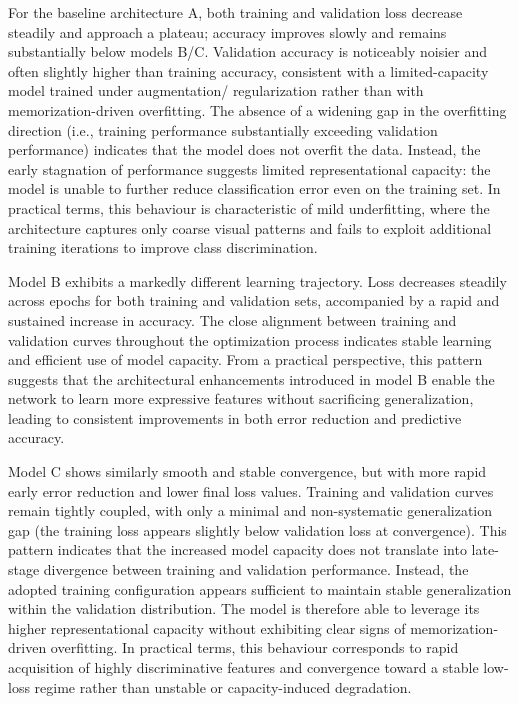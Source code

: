\documentclass{article}
\begin{document}
For the baseline architecture A, both training and validation loss 
decrease steadily and approach a plateau; accuracy improves slowly 
and remains substantially below models B/C. Validation accuracy is 
noticeably noisier and often slightly higher than training accuracy, 
consistent with a limited-capacity model trained under augmentation/
regularization rather than with memorization-driven overfitting. 
The absence of a widening gap in the overfitting direction (i.e., 
training performance substantially exceeding validation performance) 
indicates that the model does not overfit the data. Instead, the early 
stagnation of performance suggests limited representational capacity: 
the model is unable to further reduce classification error even on the training set.
In practical terms, this behaviour is characteristic of mild
underfitting, where the architecture captures only coarse visual
patterns and fails to exploit additional training iterations to improve
class discrimination.

Model B exhibits a markedly different learning trajectory. Loss
decreases steadily across epochs for both training and validation sets,
accompanied by a rapid and sustained increase in accuracy. The close
alignment between training and validation curves throughout the
optimization process indicates stable learning and efficient use of
model capacity. From a practical perspective, this pattern suggests that
the architectural enhancements introduced in model B enable the network
to learn more expressive features without sacrificing generalization,
leading to consistent improvements in both error reduction and
predictive accuracy.

Model C shows similarly smooth and stable convergence, but with more rapid 
early error reduction and lower final loss values. Training and
validation curves remain tightly coupled, with only a minimal and
non-systematic generalization gap (the training loss appears slightly 
below validation loss at convergence).
This pattern indicates that the increased model capacity does not translate 
into late-stage divergence between training and validation performance. 
Instead, the adopted training configuration appears sufficient to maintain 
stable generalization within the validation distribution. The model is 
therefore able to leverage its higher representational capacity without 
exhibiting clear signs of memorization-driven overfitting.
In practical terms, this behaviour corresponds to rapid acquisition of 
highly discriminative features and convergence toward a stable low-loss 
regime rather than unstable or capacity-induced degradation.
\end{document}
